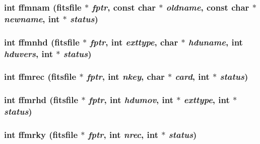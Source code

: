 \subsubsection{\setlength{\rightskip}{0pt plus 5cm}int ffmnam (\bf{fitsfile} $\ast$ {\em fptr}, const char $\ast$ {\em oldname}, const char $\ast$ {\em newname}, int $\ast$ {\em status})}\label{src_2fitsio_8h_b7f97743a5818de567c3815c43852711}


\subsubsection{\setlength{\rightskip}{0pt plus 5cm}int ffmnhd (\bf{fitsfile} $\ast$ {\em fptr}, int {\em exttype}, char $\ast$ {\em hduname}, int {\em hduvers}, int $\ast$ {\em status})}\label{src_2fitsio_8h_84dd226ce5315b62afba4631346d486f}


\subsubsection{\setlength{\rightskip}{0pt plus 5cm}int ffmrec (\bf{fitsfile} $\ast$ {\em fptr}, int {\em nkey}, char $\ast$ {\em card}, int $\ast$ {\em status})}\label{src_2fitsio_8h_64f0b7aa1396fb5dc63502db966f8acd}


\subsubsection{\setlength{\rightskip}{0pt plus 5cm}int ffmrhd (\bf{fitsfile} $\ast$ {\em fptr}, int {\em hdumov}, int $\ast$ {\em exttype}, int $\ast$ {\em status})}\label{src_2fitsio_8h_d81f4e1c55fec210faa6343d3ed455ce}


\subsubsection{\setlength{\rightskip}{0pt plus 5cm}int ffmrky (\bf{fitsfile} $\ast$ {\em fptr}, int {\em nrec}, int $\ast$ {\em status})}\label{src_2fitsio_8h_d22c9244b2bef12cd893ff4e514f49fb}


